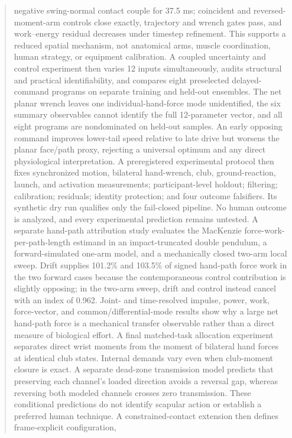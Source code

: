 \documentclass[
  letterpaper,
]{report}
\begin{document}
\begin{abstract}
negative swing-normal contact couple for 37.5 ms; coincident and
reversed-moment-arm controls close exactly, trajectory and wrench gates
pass, and work--energy residual decreases under timestep refinement.
This supports a reduced spatial mechanism, not anatomical arms, muscle
coordination, human strategy, or equipment calibration. A coupled
uncertainty and control experiment then varies 12 inputs simultaneously,
audits structural and practical identifiability, and compares eight
preselected delayed-command programs on separate training and held-out
ensembles. The net planar wrench leaves one individual-hand-force mode
unidentified, the six summary observables cannot identify the full
12-parameter vector, and all eight programs are nondominated on held-out
samples. An early opposing command improves lower-tail speed relative to
late drive but worsens the planar face/path proxy, rejecting a universal
optimum and any direct physiological interpretation. A preregistered
experimental protocol then fixes synchronized motion, bilateral
hand-wrench, club, ground-reaction, launch, and activation measurements;
participant-level holdout; filtering; calibration; residuals; identity
protection; and four outcome falsifiers. Its synthetic dry run qualifies
only the fail-closed pipeline. No human outcome is analyzed, and every
experimental prediction remains untested. A separate hand-path
attribution study evaluates the MacKenzie force-work-per-path-length
estimand in an impact-truncated double pendulum, a forward-simulated
one-arm model, and a mechanically closed two-arm local sweep. Drift
supplies 101.2\% and 103.5\% of signed hand-path force work in the two
forward cases because the contemporaneous control contribution is
slightly opposing; in the two-arm sweep, drift and control instead
cancel with an index of 0.962. Joint- and time-resolved impulse, power,
work, force-vector, and common/differential-mode results show why a
large net hand-path force is a mechanical transfer observable rather
than a direct measure of biological effort. A final matched-task
allocation experiment separates direct wrist moments from the moment of
bilateral hand forces at identical club states. Internal demands vary
even when club-moment closure is exact. A separate dead-zone
transmission model predicts that preserving each channel's loaded
direction avoids a reversal gap, whereas reversing both modeled channels
crosses zero transmission. These conditional predictions do not identify
scapular action or establish a preferred human technique. A
constrained-contact extension then defines frame-explicit configuration,

\end{abstract}
\end{document}
